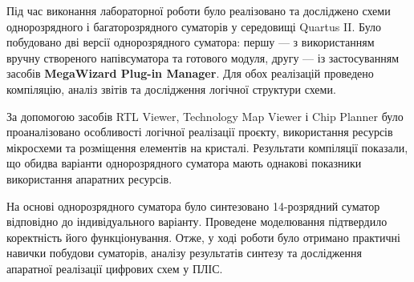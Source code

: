 \documentclass[12pt,a4paper]{article}
\begin{document}
    Під час виконання лабораторної роботи було реалізовано та досліджено схеми однорозрядного і багаторозрядного суматорів у середовищі Quartus II. Було побудовано дві версії однорозрядного суматора: першу --- з використанням вручну створеного напівсуматора та готового модуля, другу --- із застосуванням засобів \textbf{MegaWizard Plug-in Manager}. Для обох реалізацій проведено компіляцію, аналіз звітів та дослідження логічної структури схеми.

    За допомогою засобів RTL Viewer, Technology Map Viewer і Chip Planner було проаналізовано особливості логічної реалізації проєкту, використання ресурсів мікросхеми та розміщення елементів на кристалі. Результати компіляції показали, що обидва варіанти однорозрядного суматора мають однакові показники використання апаратних ресурсів.

    На основі однорозрядного суматора було синтезовано 14-розрядний суматор відповідно до індивідуального варіанту. Проведене моделювання підтвердило коректність його функціонування. Отже, у ході роботи було отримано практичні навички побудови суматорів, аналізу результатів синтезу та дослідження апаратної реалізації цифрових схем у ПЛІС.
\end{document}
